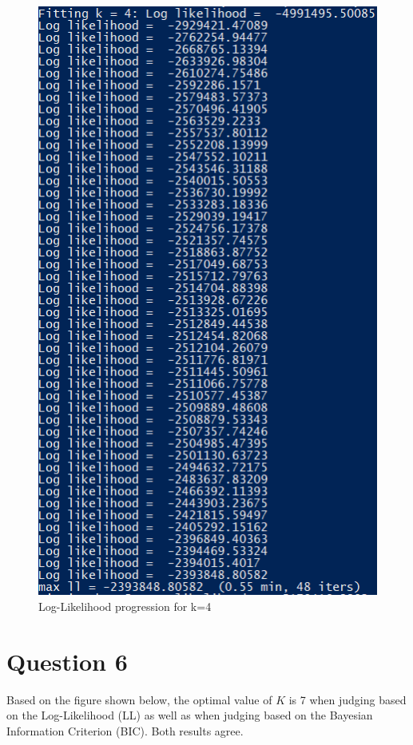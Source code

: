 \documentclass[letterpaper, 12pt]{article}
\begin{document}
\begin{figure}[!ht]    
    \centering
    \includegraphics[scale=0.9]{25LL5}
    \caption {Log-Likelihood progression for k=4}
\end{figure}

\pagebreak

\clearpage

\newpage

\section*{Question 6}

Based on the figure shown below, the optimal value of $K$ is 7 when judging based on the Log-Likelihood (LL) as well as when judging based on the Bayesian Information Criterion (BIC). Both results agree.
\end{document}
